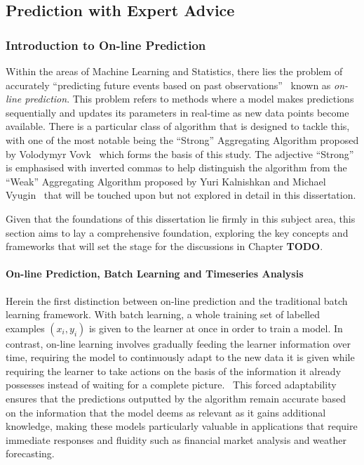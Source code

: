\subsection{Prediction with Expert Advice}
\subsubsection{Introduction to On-line Prediction}


\noindent Within the areas of Machine Learning and Statistics, there lies the problem of accurately ``predicting future events based on past observations''~\cite{cesa-bianchi:1997}  known as \textit{on-line prediction}. This problem refers to methods where a model makes predictions sequentially and updates its parameters in real-time as new data points become available. There is a particular class of algorithm that is designed to tackle this, with one of the most notable being the ``Strong'' Aggregating Algorithm proposed by Volodymyr Vovk~\cite{vovk:1990} which forms the basis of this study. The adjective ``Strong'' is emphasised with inverted commas to help distinguish the algorithm from the ``Weak'' Aggregating Algorithm proposed by Yuri Kalnishkan and Michael Vyugin~\cite{kalnishkan/vyugin:2008} that will be touched upon but not explored in detail in this dissertation.

Given that the foundations of this dissertation lie firmly in this subject area, this section aims to lay a comprehensive foundation, exploring the key concepts and frameworks that will set the stage for the discussions in Chapter \textbf{TODO}.

\paragraph*{On-line Prediction, Batch Learning and Timeseries Analysis}
Herein the first distinction between on-line prediction and the traditional batch learning framework. With batch learning, a whole training set of labelled examples $(x_i, y_i)$ is given to the learner at once in order to train a model. In contrast, on-line learning involves gradually feeding the learner information over time, requiring the model to continuously adapt to the new data it is given while requiring the learner to take actions on the basis of the information it already possesses instead of waiting for a complete picture.~\cite{kalnishkan:2015} This forced adaptability ensures that the predictions outputted by the algorithm remain accurate based on the information that the model deems as relevant as it gains additional knowledge, making these models particularly valuable in applications that require immediate responses and fluidity such as financial market analysis and weather forecasting.

